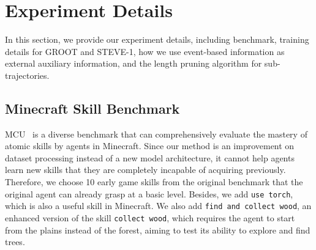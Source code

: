 \section{Experiment Details}
In this section, we provide our experiment details, including benchmark, training details for GROOT and STEVE-1, how we use event-based information as external auxiliary information, and the length pruning algorithm for sub-trajectories.
\subsection{Minecraft Skill Benchmark}
\label{app: benchmark}
MCU~\citep{mcu} is a diverse benchmark that can comprehensively evaluate the mastery of atomic skills by agents in Minecraft. Since our method is an improvement on dataset processing instead of a new model architecture, it cannot help agents learn new skills that they are completely incapable of acquiring previously. Therefore, we choose 10 early game skills from the original benchmark that the original agent can already grasp at a basic level. Besides, we add \texttt{use torch}, which is also a useful skill in Minecraft. We also add \texttt{find and collect wood}, an enhanced version of the skill \texttt{collect wood}, which requires the agent to start from the plains instead of the forest, aiming to test its ability to explore and find trees. 

